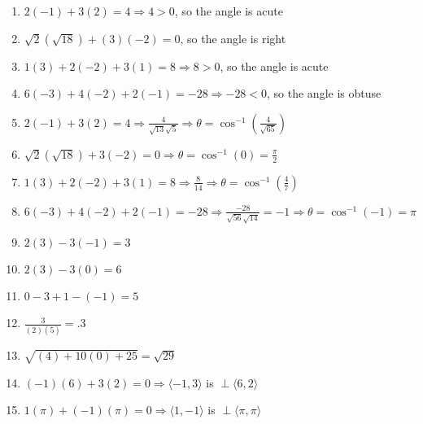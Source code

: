 \begin{enumerate}

  \item $2(-1) + 3(2) = 4\Rightarrow 4 > 0$, so the angle is acute

  \item $\sqrt{2}(\sqrt{18}) + (3)(-2) = 0$, so the angle is right

  \item $1(3) + 2(-2) + 3(1) = 8 \Rightarrow 8 > 0$, so the angle is acute

  \item $6(-3) + 4(-2) + 2(-1) = -28 \Rightarrow -28 < 0$, so the angle is obtuse

    \setcounter{enumi}{8}

  \item $2(-1) + 3(2) = 4 \Rightarrow \frac{4}{\sqrt{13}\sqrt{5}}\Rightarrow \theta = \cos^{-1}\left( \frac{4}{\sqrt{65}} \right)$

  \item $\sqrt{2}(\sqrt{18}) + 3(-2) = 0 \Rightarrow \theta = \cos^{-1} (0) = \frac{\pi}{2}$

  \item $1(3) + 2(-2) + 3(1) = 8 \Rightarrow \frac{8}{14} \Rightarrow \theta = \cos^{-1} \left( \frac{4}{7} \right)$

  \item $6(-3) + 4(-2) + 2(-1) =-28 \Rightarrow \frac{-28}{\sqrt{56}\sqrt{14}} = -1 \Rightarrow \theta = \cos^{-1}(-1) = \pi$

    \setcounter{enumi}{16}

  \item $2(3) - 3(-1) = 3$

  \item $2(3) - 3(0) = 6$

  \item $0 - 3 + 1 - (-1) = 5$

    \setcounter{enumi}{21}

  \item $\frac{3}{(2)(5)} = .3$

  \item $\sqrt{(4) + 10(0) + 25} = \sqrt{29}$

    \setcounter{enumi}{26}

  \item $(-1)(6) + 3(2) = 0 \Rightarrow \langle -1, 3 \rangle$ is $\perp \langle 6, 2\rangle$ 

  \item $1(\pi) + (-1)(\pi) = 0 \Rightarrow \langle 1, -1 \rangle$ is $\perp \langle \pi, \pi \rangle$


\end{enumerate}

